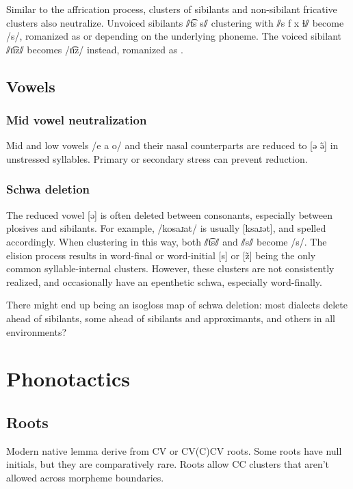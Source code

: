 Similar to the affrication process, clusters of sibilants and non-sibilant fricative clusters also neutralize. Unvoiced sibilants ⫽t͡s s⫽ clustering with ⫽s f x ɬ⫽ become /s/, romanized as  or  depending on the underlying phoneme. The voiced sibilant ⫽n͡z⫽ becomes /n͡z/ instead, romanized as .

\section{Vowels}
\subsection{Mid vowel neutralization}
Mid and low vowels /e a o/ and their nasal counterparts are reduced to [ə ə̃] in unstressed syllables. Primary or secondary stress can prevent reduction.

\subsection{Schwa deletion}
The reduced vowel [ə] is often deleted between consonants, especially between plosives and sibilants. For example,  /kosaɹat/ is usually [ksaɹət], and spelled accordingly. When clustering in this way, both ⫽t͡s⫽ and ⫽s⫽ become /s/. The elision process results in word-final or word-initial [s] or [z̃] being the only common syllable-internal clusters. However, these clusters are not consistently realized, and occasionally have an epenthetic schwa, especially word-finally. 

\begin{kaobox}[frametitle=\sc todo:] 
There might end up being an isogloss map of schwa deletion: most dialects delete ahead of sibilants, some ahead of sibilants and approximants, and others in all environments?
\end{kaobox}

\setchapterpreamble[u]{\margintoc}
\chapter{Phonotactics}
\section{Roots}
Modern native lemma derive from CV or CV(C)CV roots. Some roots have null initials, but they are comparatively rare. Roots allow CC clusters that aren't allowed across morpheme boundaries.

